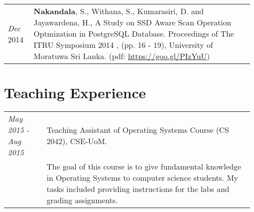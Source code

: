 \documentclass[a4paper,10pt]{article}
\begin{document}
\begin{tabular}{p{3cm}|p{13.5cm}}
\emph{Dec} 2014 & \textbf{Nakandala}, S., Withana, S., Kumarasiri, D. and Jayawardena, H., A Study on SSD Aware Scan Operation Optmization in PostgreSQL Database. Proceedings of The ITRU Symposium 2014 , (pp. 16 - 19), University of Moratuwa Sri Lanka. (pdf: \url{https://goo.gl/PIzYuU})\\

\end{tabular}


\section{Teaching Experience}
\begin{tabular}{p{3cm}|p{13.5cm}}

\emph{May 2015 - Aug 2015} & Teaching Assistant of Operating Systems Course (CS 2042), CSE-UoM.\\
&\footnotesize{The goal of this course is to give fundamental knowledge in Operating Systems to computer science students. My tasks included providing instructions for the labs and grading assignments.}\\

\end{tabular}\\


\end{document}
